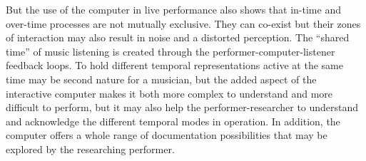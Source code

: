 
But the use of the computer in live performance also shows that in-time and over-time processes are not mutually exclusive. They can co-exist but their zones of interaction may also result in noise and a distorted perception. The ``shared time'' of music listening is created through the performer-computer-listener feedback loops. To hold different temporal representations active at the same time may be second nature for a musician, but the added aspect of the interactive computer makes it both more complex to understand and more difficult to perform, but it may also help the performer-researcher to understand and acknowledge the different temporal modes in operation. In addition, the computer offers a whole range of documentation possibilities that may be explored by the researching performer.

